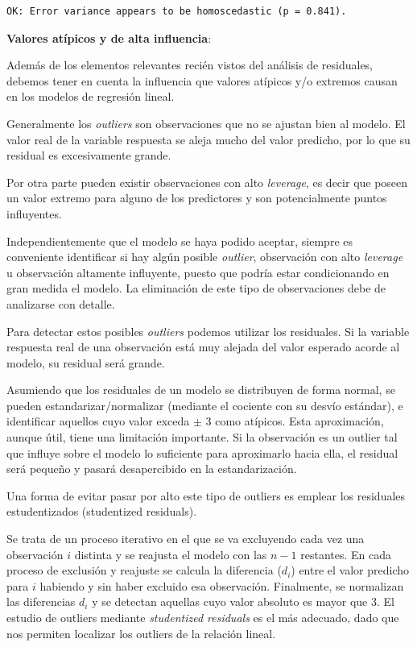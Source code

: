 \documentclass[
  letterpaper,
  DIV=11,
  numbers=noendperiod]{scrartcl}
\begin{document}
\begin{verbatim}
OK: Error variance appears to be homoscedastic (p = 0.841).
\end{verbatim}

\textbf{Valores atípicos y de alta influencia}:

Además de los elementos relevantes recién vistos del análisis de
residuales, debemos tener en cuenta la influencia que valores atípicos
y/o extremos causan en los modelos de regresión lineal.

Generalmente los \emph{outliers} son observaciones que no se ajustan
bien al modelo. El valor real de la variable respuesta se aleja mucho
del valor predicho, por lo que su residual es excesivamente grande.

Por otra parte pueden existir observaciones con alto \emph{leverage}, es
decir que poseen un valor extremo para alguno de los predictores y son
potencialmente puntos influyentes.

Independientemente que el modelo se haya podido aceptar, siempre es
conveniente identificar si hay algún posible \emph{outlier}, observación
con alto \emph{leverage} u observación altamente influyente, puesto que
podría estar condicionando en gran medida el modelo. La eliminación de
este tipo de observaciones debe de analizarse con detalle.

Para detectar estos posibles \emph{outliers} podemos utilizar los
residuales. Si la variable respuesta real de una observación está muy
alejada del valor esperado acorde al modelo, su residual será grande.

Asumiendo que los residuales de un modelo se distribuyen de forma
normal, se pueden estandarizar/normalizar (mediante el cociente con su
desvío estándar), e identificar aquellos cuyo valor exceda \(\pm\) 3
como atípicos. Esta aproximación, aunque útil, tiene una limitación
importante. Si la observación es un outlier tal que influye sobre el
modelo lo suficiente para aproximarlo hacia ella, el residual será
pequeño y pasará desapercibido en la estandarización.

Una forma de evitar pasar por alto este tipo de outliers es emplear los
residuales estudentizados (studentized residuals).

Se trata de un proceso iterativo en el que se va excluyendo cada vez una
observación \(i\) distinta y se reajusta el modelo con las \(n-1\)
restantes. En cada proceso de exclusión y reajuste se calcula la
diferencia (\(d_i\)) entre el valor predicho para \(i\) habiendo y sin
haber excluido esa observación. Finalmente, se normalizan las
diferencias \(d_i\) y se detectan aquellas cuyo valor absoluto es mayor
que 3. El estudio de outliers mediante \emph{studentized residuals} es
el más adecuado, dado que nos permiten localizar los outliers de la
relación lineal.
\end{document}

